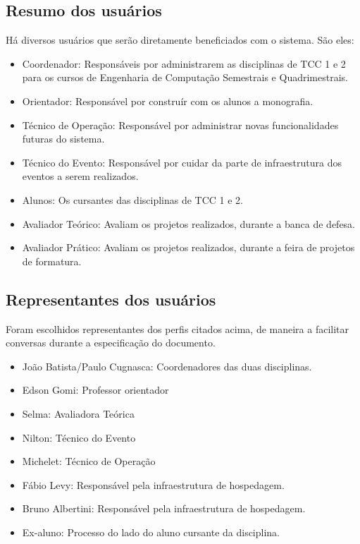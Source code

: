 \subsection{Resumo dos usuários}

Há diversos usuários que serão diretamente beneficiados com o sistema. São eles:

\begin{itemize}
    \item Coordenador: Responsáveis por administrarem as disciplinas de TCC 1 e 2 para os cursos de Engenharia de Computação Semestrais e Quadrimestrais.
    \item Orientador: Responsável por construír com os alunos a monografia.
    \item Técnico de Operação: Responsável por administrar novas funcionalidades futuras do sistema.
    \item Técnico do Evento: Responsável por cuidar da parte de infraestrutura dos eventos a serem realizados.
    \item Alunos: Os cursantes das disciplinas de TCC 1 e 2.
    \item Avaliador Teórico: Avaliam os projetos realizados, durante a banca de defesa.
    \item Avaliador Prático: Avaliam os projetos realizados, durante a feira de projetos de formatura.
\end{itemize}

\subsection{Representantes dos usuários}

Foram escolhidos representantes dos perfis citados acima, de maneira a facilitar conversas durante a especificação do documento.

\begin{itemize}
    \item João Batista/Paulo Cugnasca: Coordenadores das duas disciplinas.
    \item Edson Gomi: Professor orientador
    \item Selma: Avaliadora Teórica
    \item Nilton: Técnico do Evento
    \item Michelet: Técnico de Operação
    \item Fábio Levy: Responsável pela infraestrutura de hospedagem.
    \item Bruno Albertini: Responsável pela infraestrutura de hospedagem.
    \item Ex-aluno: Processo do lado do aluno cursante da disciplina.
\end{itemize}

